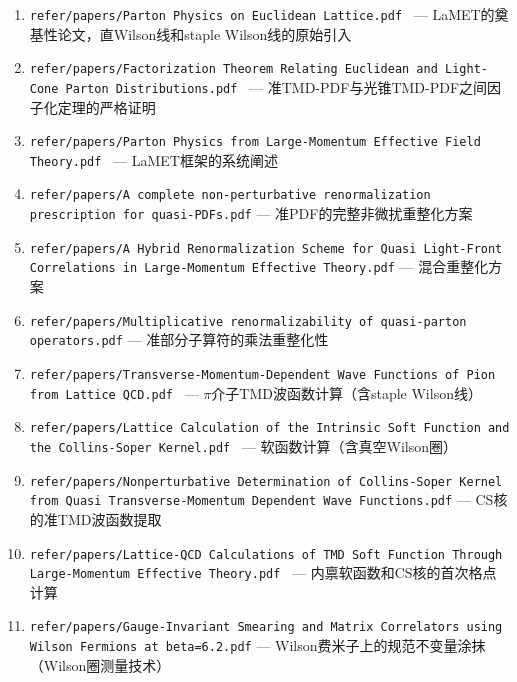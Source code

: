 \documentclass[12pt,a4paper]{ctexart}
\theoremstyle{definition}
\begin{document}
\begin{enumerate}[leftmargin=*,nosep]
    \item \texttt{refer/papers/Parton Physics on Euclidean Lattice.pdf}~\cite{Ji2013Euclidean} — LaMET的奠基性论文，直Wilson线和staple Wilson线的原始引入
    \item \texttt{refer/papers/Factorization Theorem Relating Euclidean and Light-Cone Parton Distributions.pdf}~\cite{Izubuchi2018} — 准TMD-PDF与光锥TMD-PDF之间因子化定理的严格证明
    \item \texttt{refer/papers/Parton Physics from Large-Momentum Effective Field Theory.pdf}~\cite{Ji2014LaMET} — LaMET框架的系统阐述
    \item \texttt{refer/papers/A complete non-perturbative renormalization prescription for quasi-PDFs.pdf} — 准PDF的完整非微扰重整化方案
    \item \texttt{refer/papers/A Hybrid Renormalization Scheme for Quasi Light-Front Correlations in Large-Momentum Effective Theory.pdf} — 混合重整化方案
    \item \texttt{refer/papers/Multiplicative renormalizability of quasi-parton operators.pdf} — 准部分子算符的乘法重整化性
    \item \texttt{refer/papers/Transverse-Momentum-Dependent Wave Functions of Pion from Lattice QCD.pdf}~\cite{Chu2023TMDWF} — $\pi$介子TMD波函数计算（含staple Wilson线）
    \item \texttt{refer/papers/Lattice Calculation of the Intrinsic Soft Function and the Collins-Soper Kernel.pdf}~\cite{Chu2023soft} — 软函数计算（含真空Wilson圈）
    \item \texttt{refer/papers/Nonperturbative Determination of Collins-Soper Kernel from Quasi Transverse-Momentum Dependent Wave Functions.pdf} — CS核的准TMD波函数提取
    \item \texttt{refer/papers/Lattice-QCD Calculations of TMD Soft Function Through Large-Momentum Effective Theory.pdf}~\cite{LPC2020soft} — 内禀软函数和CS核的首次格点计算
    \item \texttt{refer/papers/Gauge-Invariant Smearing and Matrix Correlators using Wilson Fermions at beta=6.2.pdf} — Wilson费米子上的规范不变量涂抹（Wilson圈测量技术）
\end{enumerate}
\end{document}
